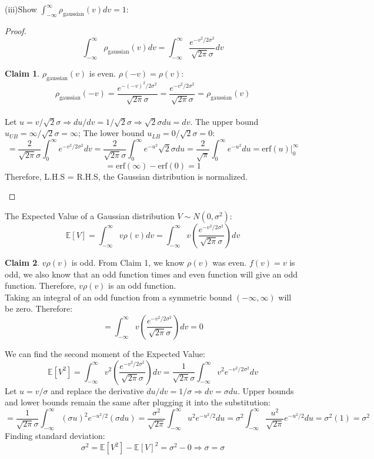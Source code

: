 \documentclass[11pt]{article}
\def\mbb{\mathbb}
\def\E{\mbb{E}}
\theoremstyle{pink}
\theoremstyle{boxedsolution}
\theoremstyle{definition}
\theoremstyle{claim}
\newtheorem{claim}{Claim}
\begin{document}
\newpage
 (iii)Show $\int^\infty_{-\infty}\rho_{\text{gaussian}}(v)dv=1$:
 \begin{proof}
 \[\int^\infty_{-\infty}\rho_{\text{gaussian}}(v)dv=\int^\infty_{-\infty}\frac{e^{-v^2/2\sigma^2}}{\sqrt{2\pi}\sigma}dv\]
 \begin{claim}
 $\rho_{\text{gaussian}}(v)$ is even. $\rho(-v)=\rho(v)$:
 \vspace{4mm}
 \[\rho_{\text{gaussian}}(-v)=\frac{e^{-(-v)^2/2\sigma^2}}{\sqrt{2\pi}\sigma}=\frac{e^{-v^2/2\sigma^2}}{\sqrt{2\pi}\sigma}=\rho_{\text{gaussian}}(v)\]
 \vspace{3mm}
 \\Let $u=v/\sqrt{2}\sigma \Rightarrow du/dv=1/\sqrt{2}\sigma \Rightarrow \sqrt{2}\sigma du = dv$. The upper bound $u_{UB}=\infty/\sqrt{2}\sigma=\infty$; The lower bound $u_{LB}=0/\sqrt{2}\sigma=0:$
 \vspace{4mm}
 \[=\frac{2}{\sqrt{2\pi}\sigma}\int^\infty_0e^{-v^2/2\sigma^2}dv=\frac{2}{\sqrt{2\pi}\sigma}\int^\infty_0e^{-u^2}\sqrt{2}\sigma du = \frac{2}{\sqrt{\pi}}\int^\infty_0e^{-u^2}du=\text{erf}(u)|^\infty_0\]
 \vspace{3mm}
 \[=\text{erf}(\infty)-\text{erf}(0)=1\]
 Therefore, L.H.S = R.H.S, the Gaussian distribution is normalized.
 \end{claim}
 \end{proof}
 The Expected Value of a Gaussian distribution $V \sim N(0,\sigma^2)$:
 \vspace{4mm}
 \[\E[V]=\int^\infty_{-\infty}v\rho(v)dv=\int^\infty_{-\infty}v\left(\frac{e^{-v^2/2\sigma^2}}{\sqrt{2\pi}\sigma}\right)dv\]
 \begin{claim}
 $v\rho(v)$ is odd. From Claim 1, we know $\rho(v)$ was even. $f(v)=v$ is odd, we also know that an odd function times and even function will give an odd function. Therefore, $v\rho(v)$ is an odd function.
 \vspace{3mm}
 \\Taking an integral of an odd function from a symmetric bound $(-\infty,\infty)$ will be zero. Therefore:
 \[=\int^\infty_{-\infty}v\left(\frac{e^{-v^2/2\sigma^2}}{\sqrt{2\pi}\sigma}\right)dv=0\]
 \end{claim}
 We can find the second moment of the Expected Value:
 \vspace{4mm}
 \[\E[V^2]=\int^\infty_{-\infty}v^2\left(\frac{e^{-v^2/2\sigma^2}}{\sqrt{2\pi}\sigma}\right)dv=\frac{1}{\sqrt{2\pi}\sigma}\int^\infty_{-\infty}v^2e^{-v^2/2\sigma^2}dv\]
 \newpage
 Let $u=v/\sigma$ and replace the derivative $du/dv=1/\sigma \Rightarrow dv = \sigma du$. Upper bounds and lower bounds remain the same after plugging it into the substitution:
 \vspace{4mm}
 \[=\frac{1}{\sqrt{2\pi}\sigma}\int^\infty_{-\infty}(\sigma u)^2e^{-u^2/2}(\sigma du)=\frac{\sigma^2}{\sqrt{2\pi}}\int^\infty_{-\infty}u^2e^{-u^2/2}du=\sigma^2\int^\infty_{-\infty}\frac{u^2}{\sqrt{2\pi}}e^{-u^2/2}du=\sigma^2(1)=\sigma^2\]
 \vspace{4mm}
 Finding standard deviation:
 \[\sigma^2=\E[V^2]-\E[V]^2=\sigma^2-0 \Rightarrow \sigma=\sigma\]
 
\end{document}
